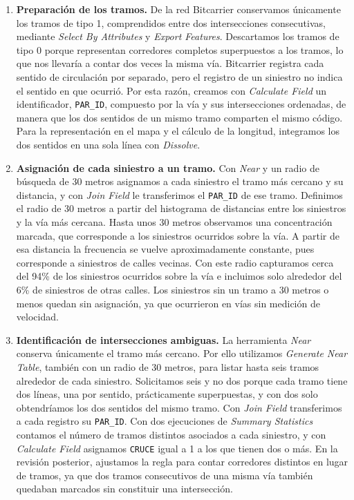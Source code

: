 \documentclass[10pt,a4paper]{article}
\begin{document}
\begin{enumerate}
\item \textbf{Preparación de los tramos.} De la red Bitcarrier conservamos únicamente los tramos de tipo 1, comprendidos entre dos intersecciones consecutivas, mediante \textit{Select By Attributes} y \textit{Export Features}. Descartamos los tramos de tipo 0 porque representan corredores completos superpuestos a los tramos, lo que nos llevaría a contar dos veces la misma vía. Bitcarrier registra cada sentido de circulación por separado, pero el registro de un siniestro no indica el sentido en que ocurrió. Por esta razón, creamos con \textit{Calculate Field} un identificador, \texttt{PAR\_ID}, compuesto por la vía y sus intersecciones ordenadas, de manera que los dos sentidos de un mismo tramo comparten el mismo código. Para la representación en el mapa y el cálculo de la longitud, integramos los dos sentidos en una sola línea con \textit{Dissolve}.

\item \textbf{Asignación de cada siniestro a un tramo.} Con \textit{Near} y un radio de búsqueda de 30 metros asignamos a cada siniestro el tramo más cercano y su distancia, y con \textit{Join Field} le transferimos el \texttt{PAR\_ID} de ese tramo. Definimos el radio de 30 metros a partir del histograma de distancias entre los siniestros y la vía más cercana. Hasta unos 30 metros observamos una concentración marcada, que corresponde a los siniestros ocurridos sobre la vía. A partir de esa distancia la frecuencia se vuelve aproximadamente constante, pues corresponde a siniestros de calles vecinas. Con este radio capturamos cerca del 94\% de los siniestros ocurridos sobre la vía e incluimos solo alrededor del 6\% de siniestros de otras calles. Los siniestros sin un tramo a 30 metros o menos quedan sin asignación, ya que ocurrieron en vías sin medición de velocidad.

\item \textbf{Identificación de intersecciones ambiguas.} La herramienta \textit{Near} conserva únicamente el tramo más cercano. Por ello utilizamos \textit{Generate Near Table}, también con un radio de 30 metros, para listar hasta seis tramos alrededor de cada siniestro. Solicitamos seis y no dos porque cada tramo tiene dos líneas, una por sentido, prácticamente superpuestas, y con dos solo obtendríamos los dos sentidos del mismo tramo. Con \textit{Join Field} transferimos a cada registro su \texttt{PAR\_ID}. Con dos ejecuciones de \textit{Summary Statistics} contamos el número de tramos distintos asociados a cada siniestro, y con \textit{Calculate Field} asignamos \texttt{CRUCE} igual a 1 a los que tienen dos o más. En la revisión posterior, ajustamos la regla para contar corredores distintos en lugar de tramos, ya que dos tramos consecutivos de una misma vía también quedaban marcados sin constituir una intersección.
\end{enumerate}
\end{document}
